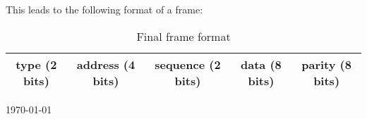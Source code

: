 \documentclass[letterpaper]{article}
\begin{document}
This leads to the following format of a frame: 

\begin{table}[htb]
	\begin{center}
	\begin{tabular}{|ccc|c|c|}
		\hline
		type (2 bits) & address (4 bits) & sequence (2 bits) & data (8 bits) & parity (8 bits)  \\
		\hline
	\end{tabular}
	\end{center}
	\caption{Final frame format}
	\label{tab:Final frame format}
\end{table}

\today
\end{document}
